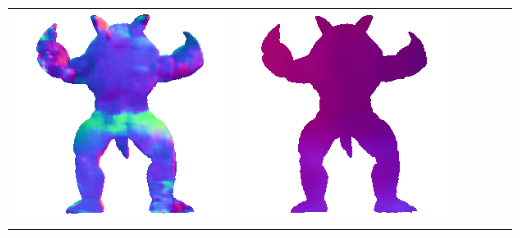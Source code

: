 \begin{tabularx}{\linewidth}{@{}Y@{}Y@{}Y@{}Y@{}Y@{}Y@{}}
\includegraphics[width=\linewidth]{semisynthetic/20160617_22_marrnet_out.png} &
\includegraphics[width=\linewidth]{semisynthetic/20160617_22_ef_out.png} \\

\end{tabularx}
